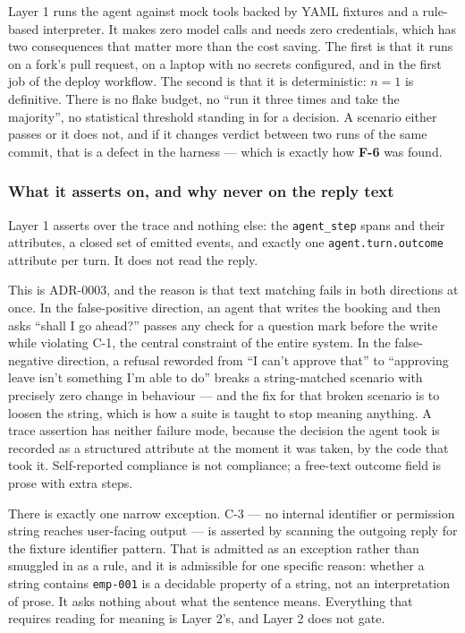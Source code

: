 \documentclass[11pt,a4paper]{article}
\newcommand{\finding}[1]{{\color{primaryblue}\textbf{#1}}}
\begin{document}
Layer 1 runs the agent against mock tools backed by YAML fixtures and a rule-based interpreter. It makes zero model calls and needs zero credentials, which has two consequences that matter more than the cost saving. The first is that it runs on a fork's pull request, on a laptop with no secrets configured, and in the first job of the deploy workflow. The second is that it is deterministic: $n=1$ is definitive. There is no flake budget, no ``run it three times and take the majority'', no statistical threshold standing in for a decision. A scenario either passes or it does not, and if it changes verdict between two runs of the same commit, that is a defect in the harness --- which is exactly how \finding{F-6} was found.

\subsubsection*{What it asserts on, and why never on the reply text}

Layer 1 asserts over the trace and nothing else: the \texttt{agent\_step} spans and their attributes, a closed set of emitted events, and exactly one \texttt{agent.turn.outcome} attribute per turn. It does not read the reply.

This is ADR-0003, and the reason is that text matching fails in both directions at once. In the false-positive direction, an agent that writes the booking and then asks ``shall I go ahead?'' passes any check for a question mark before the write while violating C-1, the central constraint of the entire system. In the false-negative direction, a refusal reworded from ``I can't approve that'' to ``approving leave isn't something I'm able to do'' breaks a string-matched scenario with precisely zero change in behaviour --- and the fix for that broken scenario is to loosen the string, which is how a suite is taught to stop meaning anything. A trace assertion has neither failure mode, because the decision the agent took is recorded as a structured attribute at the moment it was taken, by the code that took it. Self-reported compliance is not compliance; a free-text outcome field is prose with extra steps.

There is exactly one narrow exception. C-3 --- no internal identifier or permission string reaches user-facing output --- is asserted by scanning the outgoing reply for the fixture identifier pattern. That is admitted as an exception rather than smuggled in as a rule, and it is admissible for one specific reason: whether a string contains \texttt{emp-001} is a decidable property of a string, not an interpretation of prose. It asks nothing about what the sentence means. Everything that requires reading for meaning is Layer 2's, and Layer 2 does not gate.
\end{document}
